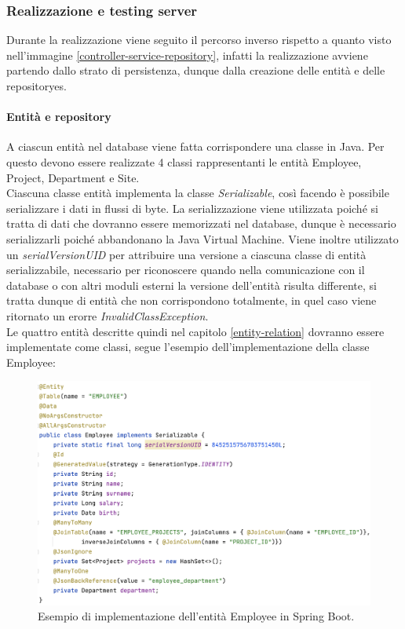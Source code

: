 \subsubsection*{Realizzazione e testing server}
Durante la realizzazione viene seguito il percorso inverso rispetto a quanto visto nell'immagine \ref{controller-service-repository}, infatti la realizzazione avviene partendo dallo strato di persistenza, dunque dalla creazione delle entità e delle repositoryes.
\paragraph{Entità e repository}
A ciascun entità nel database viene fatta corrispondere una classe in Java. Per questo devono essere realizzate 4 classi rappresentanti le entità Employee, Project, Department e Site.\\
Ciascuna classe entità implementa la classe \textit{Serializable}, così facendo è possibile serializzare i dati in flussi di byte. La serializzazione viene utilizzata poiché si tratta di dati che dovranno essere memorizzati nel database, dunque è necessario serializzarli poiché abbandonano la Java Virtual Machine. Viene inoltre utilizzato un \textit{serialVersionUID} per attribuire una versione a ciascuna classe di entità serializzabile, necessario per riconoscere quando nella comunicazione con il database o con altri moduli esterni la versione dell'entità risulta differente, si tratta dunque di entità che non corrispondono totalmente, in quel caso viene ritornato un erorre \textit{InvalidClassException}.\\
Le quattro entità descritte quindi nel capitolo \ref{entity-relation} dovranno essere implementate come classi, segue l'esempio dell'implementazione della classe Employee:
\FloatBarrier
\begin{figure}[!ht]
\centering
\includegraphics[width=0.9\linewidth]{immagini/employee_entity.png}
\caption{Esempio di implementazione dell'entità Employee in Spring Boot.}
\label{employee-entity-definition}
\end{figure}
